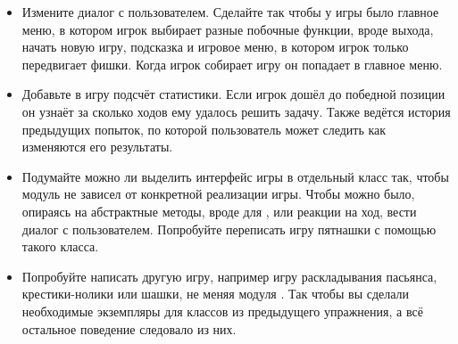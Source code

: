 \begin{itemize}

\item Измените диалог с пользователем. Сделайте 
    так чтобы у игры было главное меню, в котором
    игрок выбирает разные побочные функции, вроде
    выхода, начать новую игру, подсказка и игровое
    меню, в котором игрок только передвигает фишки.
    Когда игрок собирает игру он попадает в 
    главное меню.

\item Добавьте в игру подсчёт статистики. Если игрок
    дошёл до победной позиции он узнаёт за сколько ходов ему
    удалось решить задачу. Также ведётся история
	предыдущих попыток, по которой пользователь может
	следить как изменяются его результаты. 

\item Подумайте можно ли выделить интерфейс игры в 
	отдельный класс так,
  чтобы модуль  не зависел от конкретной реализации
  игры. Чтобы можно было, опираясь на абстрактные методы, 
  вроде  для , или реакции на ход, 
  вести диалог с пользователем. Попробуйте переписать
  игру пятнашки с помощью такого класса. 

\item Попробуйте написать другую игру, например
    игру раскладывания пасьянса, крестики-нолики
    или шашки, не меняя модуля .
    Так чтобы вы сделали необходимые экземпляры для классов
    из предыдущего упражнения, а всё
    остальное поведение следовало из них.
\end{itemize}

